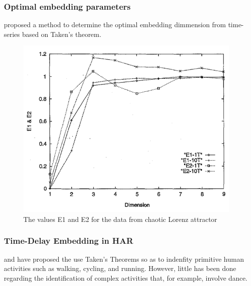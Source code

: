 \documentclass{beamer}
\theoremstyle{definition}
\begin{document}
\begin{bibunit}[apalike]
\begin{frame}
\frametitle{Optimal embedding parameters}

\cite{Cao1997} proposed a method
to determine the optimal embedding dimmension
from time-series based on Taken's theorem.

\begin{figure}
\includegraphics[scale=0.15]{e1e2cao1997}
\caption{The values E1 and E2 for the data from chaotic Lorenz attractor}
\end{figure}
\end{frame}
\end{bibunit}





\begin{bibunit}[apalike]
\begin{frame}
\frametitle{Time-Delay Embedding in HAR}

\cite{Jordan2010} and \cite{Sama2013} have proposed the use Taken's Theorems
so as to indenfity primitive human activities such as walking, cycling, and 
running. However, little has been done regarding the identification of
complex activities that, for example, involve dance.

    \vfill
\end{frame}
\end{bibunit}
\end{document}
